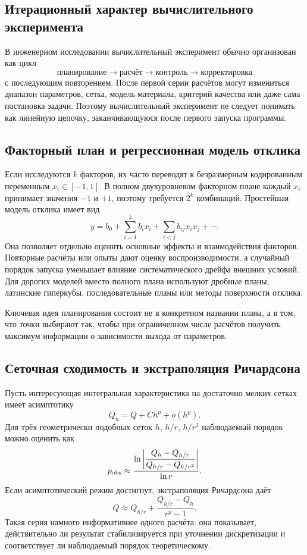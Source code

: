 \subsection{Итерационный характер вычислительного эксперимента}

В инженерном исследовании вычислительный эксперимент обычно организован как
цикл
\[
\boxed{
\text{планирование}\to\text{расчёт}\to\text{контроль}\to\text{корректировка}
}
\]
с последующим повторением. После первой серии расчётов могут измениться диапазон
параметров, сетка, модель материала, критерий качества или даже сама постановка
задачи. Поэтому вычислительный эксперимент не следует понимать как линейную
цепочку, заканчивающуюся после первого запуска программы.

\subsection{Факторный план и регрессионная модель отклика}

Если исследуются $k$ факторов, их часто переводят к безразмерным кодированным
переменным $x_i\in[-1,1]$. В полном двухуровневом факторном плане каждый
$x_i$ принимает значения $-1$ и $+1$, поэтому требуется $2^k$ комбинаций.
Простейшая модель отклика имеет вид
\[
    y=b_0+\sum_{i=1}^k b_i x_i
      +\sum_{i<j}b_{ij}x_ix_j+\cdots.
\]
Она позволяет отдельно оценить основные эффекты и взаимодействия факторов.
Повторные расчёты или опыты дают оценку воспроизводимости, а случайный порядок
запуска уменьшает влияние систематического дрейфа внешних условий. Для дорогих
моделей вместо полного плана используют дробные планы, латинские гиперкубы,
последовательные планы или методы поверхности отклика.

Ключевая идея планирования состоит не в конкретном названии плана, а в том, что
точки выбирают так, чтобы при ограниченном числе расчётов получить максимум
информации о зависимости выхода от параметров.

\subsection{Сеточная сходимость и экстраполяция Ричардсона}

Пусть интересующая интегральная характеристика на достаточно мелких сетках
имеет асимптотику
\[
    Q_h=Q+C h^p+o(h^p).
\]
Для трёх геометрически подобных сеток $h$, $h/r$, $h/r^2$ наблюдаемый порядок
можно оценить как
\[
    p_{\rm obs}\approx
    \frac{\ln\left|\dfrac{Q_h-Q_{h/r}}{Q_{h/r}-Q_{h/r^2}}\right|}{\ln r}.
\]
Если асимптотический режим достигнут, экстраполяция Ричардсона даёт
\[
    Q\approx Q_{h/r}
    +\frac{Q_{h/r}-Q_h}{r^p-1}.
\]
Такая серия намного информативнее одного расчёта: она показывает, действительно
ли результат стабилизируется при уточнении дискретизации и соответствует ли
наблюдаемый порядок теоретическому.

